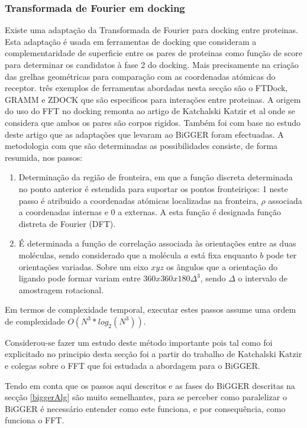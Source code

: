 \subsubsection{Transformada de Fourier em docking}
\label{fft}
Existe uma adaptação da Transformada de Fourier para docking entre proteinas. Esta adaptação é usada em ferramentas de docking que consideram a complementaridade de superficie entre os pares de proteinas como função de score para determinar os candidatos à fase 2 do docking. Mais precisamente na criação das grelhas geométricas para comparação com as coordenadas atómicas do receptor. três exemplos de ferramentas abordadas nesta secção são o FTDock, GRAMM e ZDOCK que são especificos para interações entre proteinas.
A origem do uso do FFT no docking remonta ao artigo de Katchalski Katzir et al \cite{katchalski1992} onde se considera que ambos os pares são corpos rigidos. Também foi com base no estudo deste artigo que as adaptações que levaram ao BiGGER foram efectuadas\cite{biggerPaper}.
 A metodologia com que são determinadas as possibilidades consiste, de forma resumida, nos passos:
\begin{enumerate}
	\item Determinação da região de fronteira, em que a função discreta determinada no ponto anterior é estendida para suportar os pontos fronteiriços: 1 neste passo é atribuido a coordenadas atómicas localizadas na fronteira, $\rho$ associada a coordenadas internas e 0 a externas. A esta função é designada função distreta de Fourier (DFT).
	
	\item É determinada a função de correlação associada às orientações entre as duas moléculas, sendo considerado que a molécula $a$ está fixa enquanto $b$ pode ter orientações variadas. Sobre um eixo $xyz$ os ângulos que a orientação do ligando pode formar variam entre $360x360x180\Delta^{3}$, sendo $\Delta$ o intervalo de amostragem rotacional.

\end{enumerate} 
Em termos de complexidade temporal, executar estes passos assume uma ordem de complexidade $O(N^{3}*log_2(N^{3}))$\cite{teseProf}.

Considerou-se fazer um estudo deste método importante pois tal como foi explicitado no principio desta secção foi a partir do trabalho de Katchalski Katzir e colegas sobre o FFT que foi estudada a abordagem para o BiGGER\cite{teseProf}. 

Tendo em conta que os passos aqui descritos e as fases do BiGGER descritas na secção \ref{biggerAlg} são muito semelhantes, para se perceber como paralelizar o BiGGER é necessário entender como este funciona, e por consequência, como funciona o FFT. 

